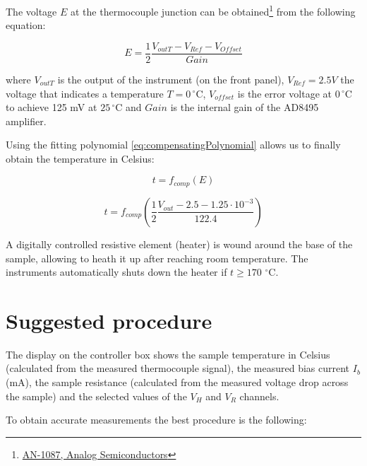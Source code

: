\documentclass[]{book}
\let\rmarkdownfootnote\footnote%
\def\footnote{\protect\rmarkdownfootnote}
\begin{document}
The voltage \(E\) at the thermocouple junction can be obtained\footnote{\href{http://www.analog.com/Assets/Figures/en/technical-documentation/application-notes/AN-1087.PDF}{AN-1087,
  Analog Semiconductors}} from the following equation:

\begin{equation}
E=\frac { 1 }{ 2 } \frac {  V_{ outT }-{ V }_{ Ref }-{ V }_{ Offset } }{ Gain } 
\label{eq:voltageAtThermocoupleJunction}
\end{equation}

where \(V_{outT}\) is the output of the instrument (on the front panel),
\(V_{Ref}=2.5V\) the voltage that indicates a temperature
\(T=0\,^{\circ}\mathrm{C}\), \(V_{offset}\) is the error voltage at
\(0\,^{\circ}\mathrm{C}\) to achieve 125 mV at
\(25\,^{\circ}\mathrm{C}\) and \(Gain\) is the internal gain of the
AD8495 amplifier.

Using the fitting polynomial \eqref{eq:compensatingPolynomial} allows us
to finally obtain the temperature in Celsius:

\begin{equation}
t={ f }_{ comp }\left( E \right)
\label{eq:FcompE}
\end{equation}

\begin{equation}
t={ f }_{ comp } \left( \frac { 1 }{ 2 } \frac { V_{ out }-2.5-1.25\cdot 10^{ -3 } }{ 122.4 } \right)
\label{eq:ad8494Compensated}
\end{equation}

A digitally controlled resistive element (heater) is wound around the
base of the sample, allowing to heath it up after reaching room
temperature. The instruments automatically shuts down the heater if
\(t \ge 170\, \,^{\circ}\mathrm{C}\).

\clearpage 

\section{Suggested procedure}\label{suggested-procedure}

The display on the controller box shows the sample temperature in
Celsius (calculated from the measured thermocouple signal), the measured
bias current \(I_b\) (mA), the sample resistance (calculated from the
measured voltage drop across the sample) and the selected values of the
\(V_H\) and \(V_R\) channels.

To obtain accurate measurements the best procedure is the following:
\end{document}
